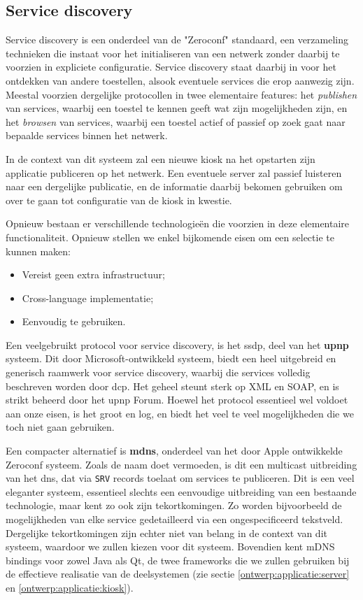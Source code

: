 \subsection{Service discovery}

Service discovery is een onderdeel van de "Zeroconf" standaard, een verzameling technieken die instaat voor het initialiseren van een netwerk zonder daarbij te voorzien in expliciete configuratie. Service discovery staat daarbij in voor het ontdekken van andere toestellen, alsook eventuele services die erop aanwezig zijn. Meestal voorzien dergelijke protocollen in twee elementaire features: het \emph{publishen} van services, waarbij een toestel te kennen geeft wat zijn mogelijkheden zijn, en het \emph{browsen} van services, waarbij een toestel actief of passief op zoek gaat naar bepaalde services binnen het netwerk.

In de context van dit systeem zal een nieuwe kiosk na het opstarten zijn applicatie publiceren op het netwerk. Een eventuele server zal passief luisteren naar een dergelijke publicatie, en de informatie daarbij bekomen gebruiken om over te gaan tot configuratie van de kiosk in kwestie.

Opnieuw bestaan er verschillende technologieën die voorzien in deze elementaire functionaliteit. Opnieuw stellen we enkel bijkomende eisen om een selectie te kunnen maken:
\begin{itemize}
\item Vereist geen extra infrastructuur;
\item Cross-language implementatie;
\item Eenvoudig te gebruiken.
\end{itemize}

Een veelgebruikt protocol voor service discovery, is het \ac{ssdp}, deel van het \textbf{\ac{upnp}} systeem. Dit door Microsoft-ontwikkeld systeem, biedt een heel uitgebreid en generisch raamwerk voor service discovery, waarbij die services volledig beschreven worden door \ac{dcp}. Het geheel steunt sterk op XML en SOAP, en is strikt beheerd door het \ac{upnp} Forum. Hoewel het protocol essentieel wel voldoet aan onze eisen, is het groot en log, en biedt het veel te veel mogelijkheden die we toch niet gaan gebruiken.

Een compacter alternatief is \textbf{\ac{mdns}}, onderdeel van het door Apple ontwikkelde Zeroconf systeem. Zoals de naam doet vermoeden, is dit een multicast uitbreiding van het \ac{dns}, dat via \texttt{SRV} records toelaat om services te publiceren. Dit is een veel eleganter systeem, essentieel slechts een eenvoudige uitbreiding van een bestaande technologie, maar kent zo ook zijn tekortkomingen. Zo worden bijvoorbeeld de mogelijkheden van elke service gedetailleerd via een ongespecificeerd tekstveld. Dergelijke tekortkomingen zijn echter niet van belang in de context van dit systeem, waardoor we zullen kiezen voor dit systeem. Bovendien kent mDNS bindings voor zowel Java als Qt, de twee frameworks die we zullen gebruiken bij de effectieve realisatie van de deelsystemen (zie sectie \ref{ontwerp:applicatie:server} en \ref{ontwerp:applicatie:kiosk}).

